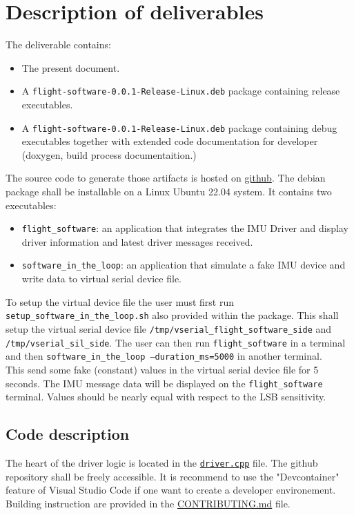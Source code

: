 \section{Description of deliverables}
The deliverable contains:
\begin{itemize}
    \item The present document.
    \item A \texttt{flight-software-0.0.1-Release-Linux.deb} package containing release executables.
    \item A \texttt{flight-software-0.0.1-Release-Linux.deb} package containing debug executables together with extended code documentation for developer (doxygen, build process documentaition.)
\end{itemize}

The source code to generate those artifacts is hosted on \href{https://github.com/renn0xtek9/assignment}{github}.
The debian package shall be installable on a Linux Ubuntu 22.04 system.
It contains two executables:
\begin{itemize}
    \item \texttt{flight\_software}: an application that integrates the IMU Driver and display driver information and latest driver messages received.
    \item \texttt{software\_in\_the\_loop}: an application that simulate a fake IMU device and write data to virtual serial device file.
\end{itemize}
To setup the virtual device file the user must first run \texttt{setup\_software\_in\_the\_loop.sh} also provided within the package.
This shall setup the virtual serial device file \texttt{/tmp/vserial\_flight\_software\_side} and \texttt{/tmp/vserial\_sil\_side}. \newline
The user can then run \newline \texttt{flight\_software} \newline in a terminal and then \newline \texttt{software\_in\_the\_loop --duration\_ms=5000} \newline in another terminal. \\
This send some fake (constant) values in the virtual serial device file for 5 seconds.
The IMU message data will be displayed on the \texttt{flight\_software} terminal. Values should be nearly equal with respect to the LSB sensitivity.

\subsection{Code description}
The heart of the driver logic is located in the \href{https://github.com/renn0xtek9/assignment/blob/master/flight_software/libs/embedded_software/uart_imu_driver/src/driver.cpp}{\texttt{driver.cpp}} file.
The github repository shall be freely accessible. It is recommend to use the "Devcontainer" feature of Visual Studio Code if one want to create a developer environement.
Building instruction are provided in the \href{https://github.com/renn0xtek9/assignment/blob/master/CONTRIBUTING.md}{CONTRIBUTING.md} file.

